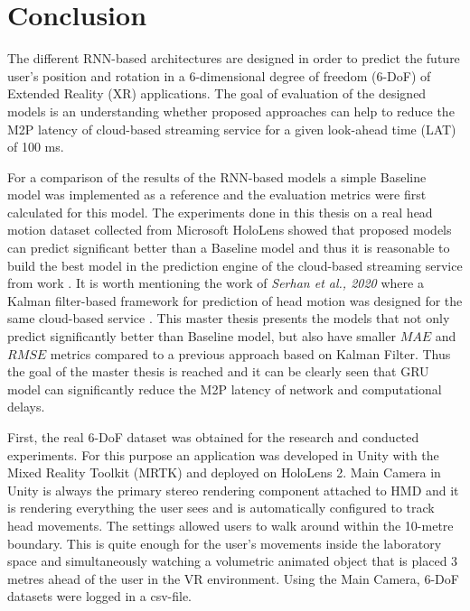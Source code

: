 \chapter{Conclusion}
\label{sec:conclusion}
The different RNN-based architectures are designed in order to predict the future user's position and rotation in a 6-dimensional degree of freedom (6-DoF) of Extended Reality (XR) applications. The goal of evaluation of the designed models is an understanding whether proposed approaches can help to reduce the M2P latency of cloud-based streaming service for a given look-ahead time (LAT) of 100 ms. 

For a comparison of the results of the RNN-based models a simple Baseline model was implemented as a reference and the evaluation metrics were first calculated for this model. The experiments done in this thesis on a real head motion dataset collected from Microsoft HoloLens showed that proposed models can predict significant better than a Baseline model and thus it is reasonable to build the best model in the prediction engine of the cloud-based streaming service from work \cite{serhan_cloud_streaming}. It is worth mentioning the work of \textit{Serhan et al., 2020} where a Kalman filter-based framework for prediction of head motion was designed for the same cloud-based service \cite{serhan_kalman}. This master thesis presents the models that not only predict significantly better than Baseline model, but also have smaller $MAE$ and $RMSE$ metrics compared to a previous approach based on Kalman Filter. Thus the goal of the master thesis is reached and it can be clearly seen that GRU model can significantly reduce the M2P latency of network and computational delays.

First, the real 6-DoF dataset was obtained for the research and conducted experiments. For this purpose an application was developed in Unity with the Mixed Reality Toolkit (MRTK) and deployed on HoloLens 2. Main Camera in Unity is always the primary stereo rendering component attached to HMD and it is rendering everything the user sees and is automatically configured to track head movements. The settings allowed users to walk around within the 10-metre boundary. This is quite enough for the user's movements inside the laboratory space and simultaneously watching a volumetric animated object that is placed 3 metres ahead of the user in the VR environment. Using the Main Camera, 6-DoF datasets were logged in a csv-file.

